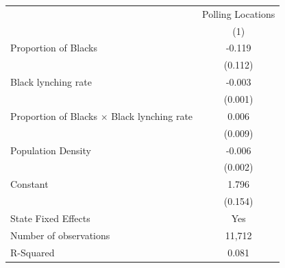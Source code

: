 {
\def\sym#1{\ifmmode^{#1}\else\(^{#1}\)\fi}
\begin{tabular}{l*{1}{c}}
\hline\hline
                    &\multicolumn{1}{c}{Polling Locations}\\
                    &         (1)\\
\hline
Proportion of Blacks&      -0.119\\
                    &     (0.112)\\
Black lynching rate &      -0.003\\
                    &     (0.001)\\
Proportion of Blacks $\times$ Black lynching rate&       0.006\\
                    &     (0.009)\\
Population Density  &      -0.006\\
                    &     (0.002)\\
Constant            &       1.796\\
                    &     (0.154)\\
State Fixed Effects &         Yes\\
\hline
Number of observations&      11,712\\
R-Squared           &       0.081\\
\hline\hline
\end{tabular}
}
